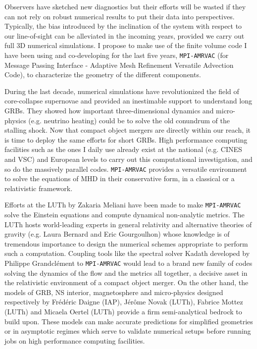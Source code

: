 \documentclass[12pt,onecolumn]{article}
\makeatletter
\newcommand{\grb}{GRB\xspace}
\newcommand{\grbs}{GRBs\xspace}
\newcommand{\mhd}{MHD\xspace}
\newcommand*{\ns}{NS\@\xspace}
\newcommand*{\eg}{e.g.\@\xspace}
\makeatother
\begin{document}
Observers have sketched new diagnostics \citep{Gill2018} but their efforts will be wasted if they can not rely on robust numerical results to put their data into perspectives. Typically, the bias introduced by the inclination of the system with respect to our line-of-sight can be alleviated in the incoming years, provided we carry out full 3D numerical simulations. I propose to make use of the finite volume code I have been using and co-developing for the last five years, \texttt{MPI-AMRVAC} (for Message Passing Interface - Adaptive Mesh Refinement Versatile Advection Code), to characterize the geometry of the different components.

During the last decade, numerical simulations have revolutionized the field of core-collapse supernovae and provided an inestimable support to understand long \grbs. They showed how important three-dimensional dynamics and micro-physics (\eg neutrino heating) could be to solve the old conundrum of the stalling shock. Now that compact object mergers are directly within our reach, it is time to deploy the same efforts for short \grbs. High performance computing facilities such as the ones I daily use already exist at the national (\eg CINES and VSC) and European levels to carry out this computational investigation, and so do the massively parallel codes. \texttt{MPI-AMRVAC} provides a versatile environment to solve the equations of \mhd in their conservative form, in a classical or a relativistic framework. 

Efforts at the LUTh by Zakaria Meliani have been made to make \texttt{MPI-AMRVAC} solve the Einstein equations and compute dynamical non-analytic metrics. The LUTh hosts world-leading experts in general relativity and alternative theories of gravity (\eg Laura Bernard and Eric Gourgoulhon) whose knowledge is of tremendous importance to design the numerical schemes appropriate to perform such a computation. Coupling tools like the spectral solver Kadath developed by Philippe Grandcl\'{e}ment to \texttt{MPI-AMRVAC} would lead to a brand new family of codes solving the dynamics of the flow and the metrics all together, a decisive asset in the relativistic environment of a compact object merger. On the other hand, the models of \grb, \ns interior, magnetosphere and micro-physics designed respectively by Fr\'{e}d\'{e}ric Daigne (IAP), J\'{e}r\^{o}me Novak (LUTh), Fabrice Mottez (LUTh) and Micaela Oertel (LUTh) provide a firm semi-analytical bedrock to build upon. These models can make accurate predictions for simplified geometries or in asymptotic regimes which serve to validate numerical setups before running jobs on high performance computing facilities.
\end{document}
